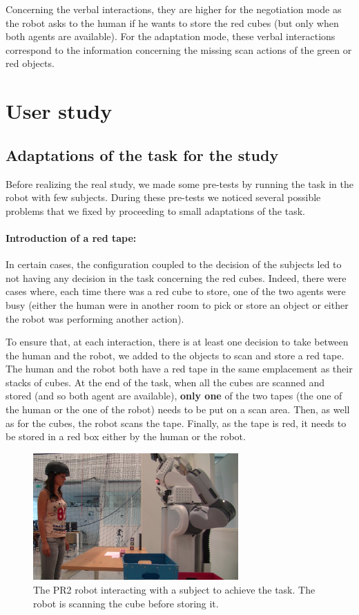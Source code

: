 \documentclass[english,a4paper,11pt,twoside]{StyleThese}
\begin{document}
Concerning the verbal interactions, they are higher for the negotiation mode as the robot asks to the human if he wants to store the red cubes (but only when both agents are available). For the adaptation mode, these verbal interactions correspond to the information concerning the missing scan actions of the green or red objects.

\section{User study}

\subsection{Adaptations of the task for the study}


Before realizing the real study, we made some pre-tests by running the task in the robot with few subjects. During these pre-tests we noticed several possible problems that we fixed by proceeding to small adaptations of the task.

\paragraph{Introduction of a red tape:}
In certain cases, the configuration coupled to the decision of the subjects led to not having any decision in the task concerning the red cubes. Indeed, there were cases where, each time there was a red cube to store, one of the two agents were busy (either the human were in another room to pick or store an object or either the robot was performing another action). 

To ensure that, at each interaction, there is at least one decision to take between the human and the robot, we added to the objects to scan and store a red tape. The human and the robot both have a red tape in the same emplacement as their stacks of cubes. At the end of the task, when all the cubes are scanned and stored (and so both agent are available), \textbf{only one} of the two tapes (the one of the human or the one of the robot) needs to be put on a scan area. Then, as well as for the cubes, the robot scans the tape. Finally, as the tape is red, it needs to be stored in a red box either by the human or the robot.


\begin{figure}[!t]
	\centering
    \includegraphics[width=0.7\textwidth]{figs/Chapter5/Scan.png}
    \caption{The PR2 robot interacting with a subject to achieve the task. The robot is scanning the cube before storing it.}
    \label{fig:scan}
\end{figure}
\end{document}
